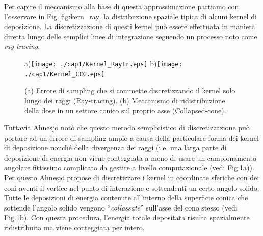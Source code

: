 {Per capire il meccanismo alla base di questa approssimazione partiamo con l'osservare in Fig.\ref{fig:kern_ray} la distribuzione spaziale tipica di alcuni kernel di deposizione. La discretizzazione di questi kernel può essere effettuata in maniera diretta lungo delle semplici linee di integrazione seguendo un processo noto come \textit{ray-tracing}.
\begin{figure}
\centering
a)\texttt{[image: ./cap1/Kernel\_RayTr.eps]}
b)\texttt{[image: ./cap1/Kernel\_CCC.eps]}
\caption{(a) Errore di sampling che si commette discretizzando il kernel solo lungo dei raggi (Ray-tracing). (b) Meccanismo di ridistribuzione della dose in un settore conico sul proprio asse (Collapsed-cone).}
\label{fig:raytrace_vs_cc}
\end{figure}
Tuttavia Ahnesj\"{o} notò che questo metodo semplicistico di discretizzazione può portare ad un errore di sampling ampio a causa della particolare forma dei kernel di deposizione nonché della divergenza dei raggi \cite{Ahnesjo1989} (i.e. una larga parte di deposizione di energia non viene conteggiata a meno di usare un campionamento angolare fittissimo complicato da gestire a livello computazionale (vedi Fig.\ref{fig:raytrace_vs_cc}a)).\\
Per questo Ahnesj\"{o} propose di discretizzare i kernel in coordinate sferiche con dei coni aventi il vertice nel punto di interazione e sottendenti un certo angolo solido. Tutte le deposizioni di energia contenute all'interno della superficie conica che sottende l'angolo solido vengono \textquotedblleft\textit{collassate}\textquotedblright{} sull'asse del cono stesso (vedi Fig.\ref{fig:raytrace_vs_cc}b). Con questa procedura, l'energia totale depositata risulta spazialmente ridistribuita ma viene conteggiata per intero.

}
